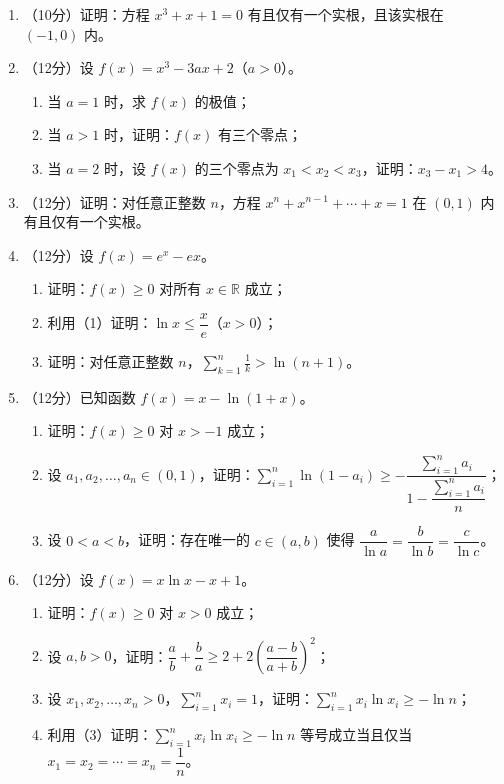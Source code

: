 \documentclass[12pt, a4paper]{ctexart}
\begin{document}
\begin{enumerate}[resume]
\item （10分）证明：方程 $x^3 + x + 1 = 0$ 有且仅有一个实根，且该实根在 $(-1, 0)$ 内。

\item （12分）设 $f(x) = x^3 - 3ax + 2$（$a > 0$）。
\begin{enumerate}[label=(\arabic*)]
\item 当 $a = 1$ 时，求 $f(x)$ 的极值；
\item 当 $a > 1$ 时，证明：$f(x)$ 有三个零点；
\item 当 $a = 2$ 时，设 $f(x)$ 的三个零点为 $x_1 < x_2 < x_3$，证明：$x_3 - x_1 > 4$。
\end{enumerate}

\item （12分）证明：对任意正整数 $n$，方程 $x^n + x^{n-1} + \cdots + x = 1$ 在 $(0, 1)$ 内有且仅有一个实根。

\item （12分）设 $f(x) = e^x - ex$。
\begin{enumerate}[label=(\arabic*)]
\item 证明：$f(x) \geqslant 0$ 对所有 $x \in \mathbb{R}$ 成立；
\item 利用（1）证明：$\ln x \leqslant \dfrac{x}{e}$（$x > 0$）；
\item 证明：对任意正整数 $n$，$\displaystyle\sum_{k=1}^{n} \frac{1}{k} > \ln(n+1)$。
\end{enumerate}

\item （12分）已知函数 $f(x) = x - \ln(1+x)$。
\begin{enumerate}[label=(\arabic*)]
\item 证明：$f(x) \geqslant 0$ 对 $x > -1$ 成立；
\item 设 $a_1, a_2, \ldots, a_n \in (0, 1)$，证明：$\displaystyle\sum_{i=1}^{n} \ln(1-a_i) \geqslant -\dfrac{\displaystyle\sum_{i=1}^{n} a_i}{1 - \dfrac{\displaystyle\sum_{i=1}^{n} a_i}{n}}$；
\item 设 $0 < a < b$，证明：存在唯一的 $c \in (a, b)$ 使得 $\dfrac{a}{\ln a} = \dfrac{b}{\ln b} = \dfrac{c}{\ln c}$。
\end{enumerate}

\item （12分）设 $f(x) = x\ln x - x + 1$。
\begin{enumerate}[label=(\arabic*)]
\item 证明：$f(x) \geqslant 0$ 对 $x > 0$ 成立；
\item 设 $a, b > 0$，证明：$\dfrac{a}{b} + \dfrac{b}{a} \geqslant 2 + 2\left(\dfrac{a - b}{a + b}\right)^2$；
\item 设 $x_1, x_2, \ldots, x_n > 0$，$\displaystyle\sum_{i=1}^{n} x_i = 1$，证明：$\displaystyle\sum_{i=1}^{n} x_i \ln x_i \geqslant -\ln n$；
\item 利用（3）证明：$\displaystyle\sum_{i=1}^{n} x_i \ln x_i \geqslant -\ln n$ 等号成立当且仅当 $x_1 = x_2 = \cdots = x_n = \dfrac{1}{n}$。
\end{enumerate}

\end{enumerate}
\end{document}
